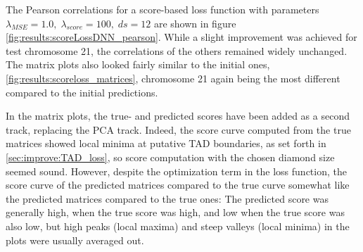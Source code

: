 The Pearson correlations for a score-based loss function with parameters $\lambda_\mathit{MSE}=1.0,\; \lambda_\mathit{score}=100,\; ds=12$ 
are shown in figure \ref{fig:results:scoreLossDNN_pearson}.
While a slight improvement was achieved for test chromosome 21, the correlations of the others remained widely unchanged.
The matrix plots also looked fairly similar to the initial ones, \cref{fig:results:scoreloss_matrices}, chromosome 21 again being the 
most different compared to the initial predictions.

In the matrix plots, the true- and predicted scores have been added as a second track, replacing the PCA track. 
Indeed, the score curve computed from the true matrices showed local minima at putative TAD boundaries, as set forth in \ref{sec:improve:TAD_loss},
so score computation with the chosen diamond size seemed sound.
However, despite the optimization term in the loss function, the score curve of the predicted matrices compared to the true curve 
somewhat like the predicted matrices compared to the true ones:
The predicted score was generally high, when the true score was high, and low when the true score was also low,
but high peaks (local maxima) and steep valleys (local minima) in the plots were usually averaged out.

